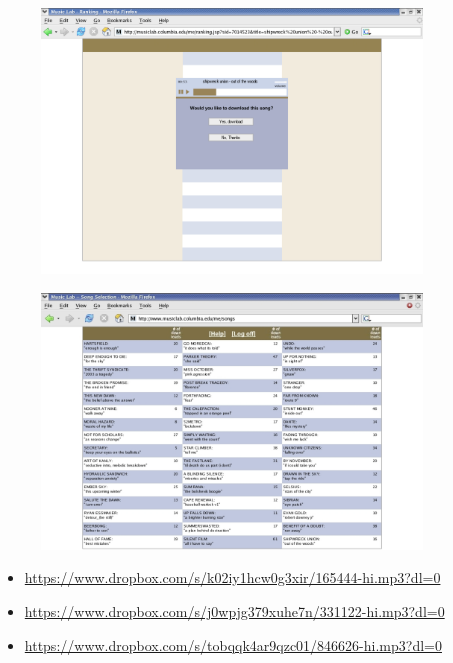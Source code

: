 \documentclass[aspectratio=169]{beamer}
\begin{document}
\begin{frame}

\begin{figure}
  \centering
  \includegraphics[width = 0.9\textwidth]{figures/downloadscreen}
\end{figure}

\end{frame}
\begin{frame}

\begin{figure}
  \centering
  \includegraphics[width = 0.9\textwidth]{figures/info-v1-cut}
\end{figure}

\end{frame}
\begin{frame}

\begin{itemize}
\item \url{https://www.dropbox.com/s/k02iy1hcw0g3xir/165444-hi.mp3?dl=0}
\item \url{https://www.dropbox.com/s/j0wpjg379xuhe7n/331122-hi.mp3?dl=0}
\item \url{https://www.dropbox.com/s/tobqqk4ar9qzc01/846626-hi.mp3?dl=0}
\end{itemize}


\end{frame}
\end{document}
